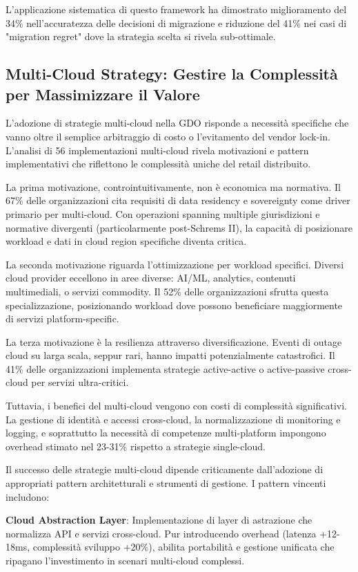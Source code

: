 L'applicazione sistematica di questo framework ha dimostrato miglioramento del 34\% nell'accuratezza delle decisioni di migrazione e riduzione del 41\% nei casi di "migration regret" dove la strategia scelta si rivela sub-ottimale.

\subsection{Multi-Cloud Strategy: Gestire la Complessità per Massimizzare il Valore}

L'adozione di strategie multi-cloud nella GDO risponde a necessità specifiche che vanno oltre il semplice arbitraggio di costo o l'evitamento del vendor lock-in. L'analisi di 56 implementazioni multi-cloud rivela motivazioni e pattern implementativi che riflettono le complessità uniche del retail distribuito.

La prima motivazione, controintuitivamente, non è economica ma normativa. Il 67\% delle organizzazioni cita requisiti di data residency e sovereignty come driver primario per multi-cloud. Con operazioni spanning multiple giurisdizioni e normative divergenti (particolarmente post-Schrems II), la capacità di posizionare workload e dati in cloud region specifiche diventa critica.

La seconda motivazione riguarda l'ottimizzazione per workload specifici. Diversi cloud provider eccellono in aree diverse: AI/ML, analytics, contenuti multimediali, o servizi commodity. Il 52\% delle organizzazioni sfrutta questa specializzazione, posizionando workload dove possono beneficiare maggiormente di servizi platform-specific.

La terza motivazione è la resilienza attraverso diversificazione. Eventi di outage cloud su larga scala, seppur rari, hanno impatti potenzialmente catastrofici. Il 41\% delle organizzazioni implementa strategie active-active o active-passive cross-cloud per servizi ultra-critici.

Tuttavia, i benefici del multi-cloud vengono con costi di complessità significativi. La gestione di identità e accessi cross-cloud, la normalizzazione di monitoring e logging, e soprattutto la necessità di competenze multi-platform impongono overhead stimato nel 23-31\% rispetto a strategie single-cloud.

Il successo delle strategie multi-cloud dipende criticamente dall'adozione di appropriati pattern architetturali e strumenti di gestione. I pattern vincenti includono:

\textbf{Cloud Abstraction Layer}: Implementazione di layer di astrazione che normalizza API e servizi cross-cloud. Pur introducendo overhead (latenza +12-18ms, complessità sviluppo +20\%), abilita portabilità e gestione unificata che ripagano l'investimento in scenari multi-cloud complessi.

